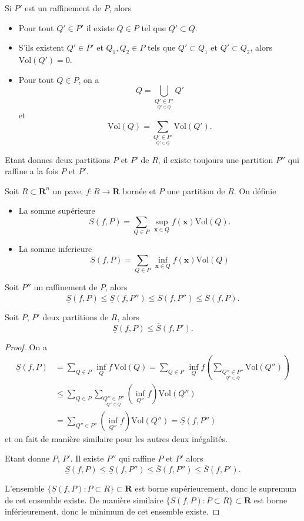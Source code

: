 \begin{remark}
Si $P'$ est un raffinement de $P$, alors 
\begin{itemize}
\item Pour tout $Q'\in P'$ il existe $Q\in P$ tel que $Q'\subset Q$.
\item S'ils existent $Q'\in P'$ et $Q_{1},Q_{2}\in P$ tels que $Q'\subset Q_{1}$ et $Q' \subset Q_{2}$, alors $\mathrm{Vol}(Q')=0$.
\item Pour tout $Q\in P$, on a  
$$
Q=\bigcup _{\underset{Q'\subset Q}{Q'\in P'}}Q'
$$
et
$$
\mathrm{Vol}(Q)=\sum _{\underset{Q'\subset Q}{Q'\in P'}}\mathrm{Vol}(Q').
$$
\end{itemize}
\end{remark}
\begin{lemma}
Etant donnes deux partitions $P$ et $P$' de $R$, il existe toujours une partition $P''$ qui raffine a la fois $P$ et $P'$.
\end{lemma}
\begin{definition}
Soit $R\subset \mathbf{R}^{n}$ un pave, $f:R\to \mathbf{R}$ bornée et $P$ une partition de $R$. On définie 
\begin{itemize}
\item La somme supérieure
$$
\overline{S}(f,P)=\sum _{Q\in P} \,\sup_{\boldsymbol{x}\in Q}f(\boldsymbol{x})\mathrm{Vol}(Q).
$$
\item La somme inferieure
$$
\underline{S}(f,P)=\sum _{Q\in P}\,\inf_{\boldsymbol{x}\in Q} f(\boldsymbol{x})\mathrm{Vol}(Q)
$$
\end{itemize}
\end{definition}
\begin{lemma}
Soit $P''$ un raffinement de $P$, alors 
$$
\underline{S}(f,P) \le \underline{S}(f,P'')\le \overline{S}(f,P'')\le \overline{S}(f,P).
$$

Soit $P$, $P'$ deux partitions de $R$, alors
$$
\underline{S}(f,P)\le \overline{S}(f,P').
$$
\end{lemma}
\begin{proof}
On a
\begin{align*}
\underline{S}(f,P) & =\sum _{Q\in P}\, \inf _{Q}f\,\mathrm{Vol}(Q) = \sum _{Q\in P}\, \inf_{Q}f\left( \sum _{\underset{Q''\subset Q}{Q''\in P''}} \mathrm{Vol}(Q'') \right) \\
 & \le \sum _{Q \in P}\sum _{\underset{Q''\subset Q}{Q''\in P''}}(\inf_{Q''}f)\mathrm{Vol}(Q'') \\
 & =\sum _{Q''\in P''}(\inf_{Q''}f )\mathrm{Vol}(Q'')=\underline{S} (f,P'')
\end{align*}
et on fait de manière similaire pour les autres deux inégalités.

Etant donne $P$, $P'$. Il existe $P''$ qui raffine $P$ et $P'$ alors
$$
\underline{S}(f,P)\le \underline{S}(f,P'')\le \overline{S}(f,P'') \le \overline{S}(f,P').
$$

L'ensemble $\{ \underline{S}(f,P):P\subset R \}\subset \mathbf{R}$ est borne supérieurement, donc le supremum de cet ensemble existe. De manière similaire $\{ \overline{S}(f,P):P\subset R \}\subset \mathbf{R}$ est borne inférieurement, donc le minimum de cet ensemble existe. 
\end{proof}
